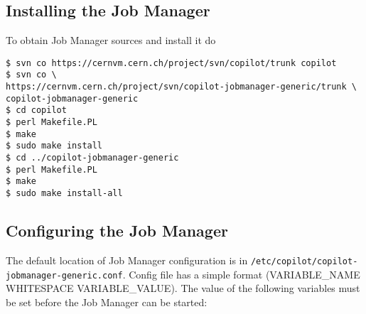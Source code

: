 \subsection{Installing the Job Manager}
To obtain Job Manager sources and install it do

\lstset{caption=\copilot Generic Job Manager installation}
\begin{lstlisting}
$ svn co https://cernvm.cern.ch/project/svn/copilot/trunk copilot
$ svn co \
https://cernvm.cern.ch/project/svn/copilot-jobmanager-generic/trunk \
copilot-jobmanager-generic
$ cd copilot
$ perl Makefile.PL
$ make
$ sudo make install
$ cd ../copilot-jobmanager-generic
$ perl Makefile.PL
$ make
$ sudo make install-all
\end{lstlisting}

\subsection{Configuring the Job Manager}
\label{sct:jmconfig}

The default location of Job Manager configuration is in \texttt{/etc/copilot/copilot-jobmanager-generic.conf}. Config file has a simple format (VARIABLE\_NAME WHITESPACE VARIABLE\_VALUE).
The value of the following variables must be set before the Job Manager can be started:

